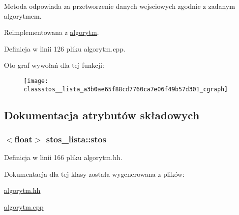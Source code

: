 \-Metoda odpowiada za przetworzenie danych wejsciowych zgodnie z zadanym algorytmem. 



\-Reimplementowana z \hyperlink{classalgorytm_af3f92bf537b1f2e1f93173983e838449}{algorytm}.



\-Definicja w linii 126 pliku algorytm.\-cpp.



\-Oto graf wywołań dla tej funkcji\-:\nopagebreak
\begin{figure}[H]
\begin{center}
\leavevmode
\texttt{[image: classstos\_\_lista\_a3b0ae65f88cd7760ca7e06f49b57d301\_cgraph]}
\end{center}
\end{figure}




\subsection{\-Dokumentacja atrybutów składowych}
\hypertarget{classstos__lista_a94fc88e5b40c7a44e2e34a6f0441853f}{
\subsubsection[{stos}]{$<$float$>$ {\bf stos\-\_\-lista\-::stos}}}\label{classstos__lista_a94fc88e5b40c7a44e2e34a6f0441853f}


\-Definicja w linii 166 pliku algorytm.\-hh.



\-Dokumentacja dla tej klasy została wygenerowana z plików\-:\begin{DoxyCompactItemize}
\item 
\hyperlink{algorytm_8hh}{algorytm.\-hh}\item 
\hyperlink{algorytm_8cpp}{algorytm.\-cpp}\end{DoxyCompactItemize}
